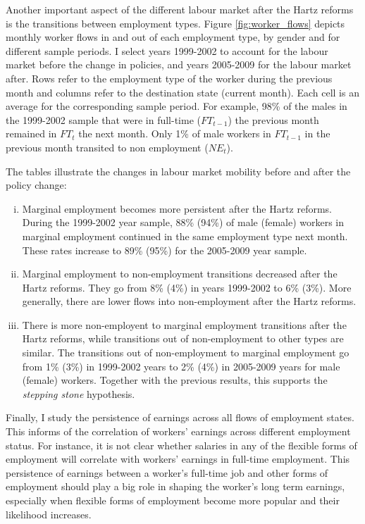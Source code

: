 \documentclass[12pt, a4paper]{article}
\begin{document}
Another important aspect of the different labour market after the Hartz reforms is the transitions between employment types. Figure \ref{fig:worker_flows} depicts monthly worker flows in and out of each employment type, by gender and for different sample periods. I select years 1999-2002 to account for the labour market before the change in policies, and years 2005-2009 for the labour market after. Rows refer to the employment type of the worker during the previous month and columns refer to the destination state (current month). Each cell is an average for the corresponding sample period. For example, 98\%  of the males in the 1999-2002 sample that were in full-time ($FT_{t-1}$) the previous month remained in $FT_{t}$ the next month. Only 1\% of male workers in $FT_{t-1}$ in the previous month transited to non employment ($NE_{t}$).

The tables illustrate the changes in labour market mobility before and after the policy change: 
\begin{enumerate}[i)]
\item Marginal employment becomes more persistent after the Hartz reforms. During the 1999-2002 year sample, 88\% (94\%) of male (female) workers in marginal employment continued in the same employment type next month. These rates increase to 89\% (95\%) for the 2005-2009 year sample. 
\item Marginal employment to non-employment transitions decreased after the Hartz reforms. They go from 8\% (4\%) in years 1999-2002 to 6\% (3\%). More generally, there are lower flows into non-employment after the Hartz reforms. %
\item There is more non-employent to marginal employment transitions after the Hartz reforms, while transitions out of non-employment to other types are similar. The transitions out of non-employment to marginal employment go from 1\% (3\%) in 1999-2002 years to 2\% (4\%) in 2005-2009 years for male (female) workers. Together with the previous results, this supports the \emph{stepping stone} hypothesis. 
\end{enumerate} 

Finally, I study the persistence of earnings across all flows of employment states. This informs of the correlation of workers' earnings across different employment status. For instance, it is not clear whether salaries in any of the flexible forms of employment will correlate with workers' earnings in full-time employment. This persistence of earnings between a worker's full-time job and other forms of employment should play a big role in shaping the worker's long term earnings, especially when flexible forms of employment become more popular and their likelihood increases.
\end{document}
